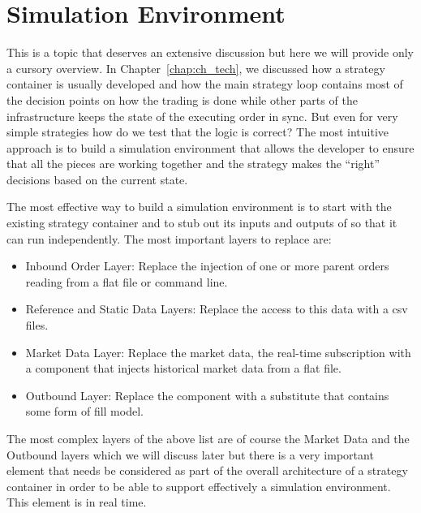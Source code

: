 \section{Simulation Environment}


This is a topic that deserves an extensive discussion but here we will provide only a cursory overview. In Chapter~\ref{chap:ch_tech}, we discussed how a strategy container is usually developed and how the main strategy loop contains most of the decision points on how the trading is done while other parts of the infrastructure keeps the state of the executing order in sync. But even for very simple strategies how do we test that the logic is correct? The most intuitive approach is to build a simulation environment that allows the developer to ensure that all the pieces are working together and the strategy makes the ``right'' decisions based on the current state. 


The most effective way to build a simulation environment is to start with the existing strategy container and to stub out its inputs and outputs of so that it can run independently.  The most important layers to replace are:
        \begin{itemize}
        \item Inbound Order Layer: Replace the injection of one or more parent orders reading from a flat file or command line.
        \item Reference and Static Data Layers: Replace the access to this data with a csv files.
        \item Market Data Layer: Replace the market data, the real-time subscription with a component that injects historical market data from a flat file.
        \item Outbound Layer: Replace the component with a substitute that contains some form of fill model.
        \end{itemize}

The most complex layers of the above list are of course the Market Data and the Outbound layers which we will discuss later but there is a very important element that needs be considered as part of the overall architecture of a strategy container in order to be able to support effectively a simulation environment. This element is in real time. \\


